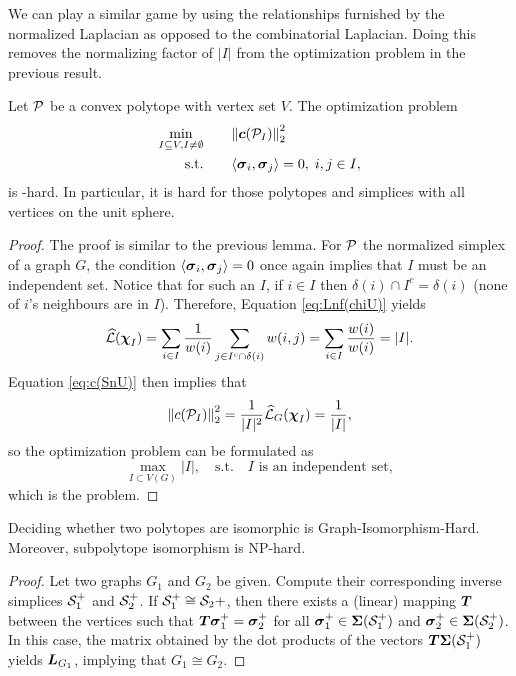 We can play a similar game by using the relationships furnished by the normalized Laplacian as opposed to the combinatorial Laplacian. Doing this removes the normalizing factor of $|I|$ from the optimization problem in the previous result.  

\begin{lemma}
	Let $\P$ be a convex polytope with vertex set $V$. The optimization problem
	\begin{alignat*}{2}
	\min_{I\subset V, I\neq \emptyset} & \quad &&  {\norm{\cent(\P_I)}_2^2} \\
	\text{s.t.}&  &&  \la \sv_i,\sv_j\ra=0,\; i,j\in I,
	\end{alignat*}
	is \NP-hard. In particular, it is hard for those polytopes and simplices with all vertices on the unit sphere. 
\end{lemma}
\begin{proof}
	The proof is similar to the previous lemma. For $\P$ the normalized simplex of a graph $G$, the condition $\la \sv_i,\sv_j\ra=0$ once again implies that $I$ must be an independent set. Notice that for such an $I$, if $i\in I$ then $\delta(i) \cap I^c = \delta(i)$ (none of $i$'s neighbours are in $I$). Therefore, Equation \eqref{eq:Lnf(chiU)} yields 
	\begin{align*}
	\Lnf(\bchi_I)=\sum_{i\in I}\frac{1}{w(i)}\sum_{j\in I^c\cap \delta(i)} w(i,j) = \sum_{i\in I}\frac{w(i)}{w(i)} = |I|.
	\end{align*}
	Equation \eqref{eq:c(SnU)} then implies that 
	\[\norm{c(\P_I)}_2^2=\frac{1}{|I|^2}\Lnf_G(\bchi_I)=\frac{1}{|I|},\]
	so the optimization problem can be formulated as 
	\[\max_{I\subset V(G)} |I|,\quad  \text{s.t.} \quad I \text{ is an independent set},\]
	which is the \iset problem. 
\end{proof}


\begin{theorem}
Deciding whether two polytopes are isomorphic is Graph-Isomorphism-Hard. Moreover, subpolytope isomorphism is NP-hard. 
\end{theorem}
\begin{proof}
	Let two graphs $G_1$ and $G_2$ be given. Compute their corresponding inverse simplices $\splx_1^+$ and $\splx_2^+$. If $\splx_1^+\cong\splx_2+$, then there exists a (linear) mapping $\T$ between the vertices such that $\T \sv_1^+=\sv_2^+$ for all $\sv_1^+\in \Sv(\splx_1^+)$ and $\sv_2^+\in \Sv(\splx_2^+)$. In this case, the matrix obtained by the dot products of the vectors $\T\Sv(\splx_1^+)$ yields $\L_{G_1}$, implying that $G_1\cong G_2$.  
\end{proof}

